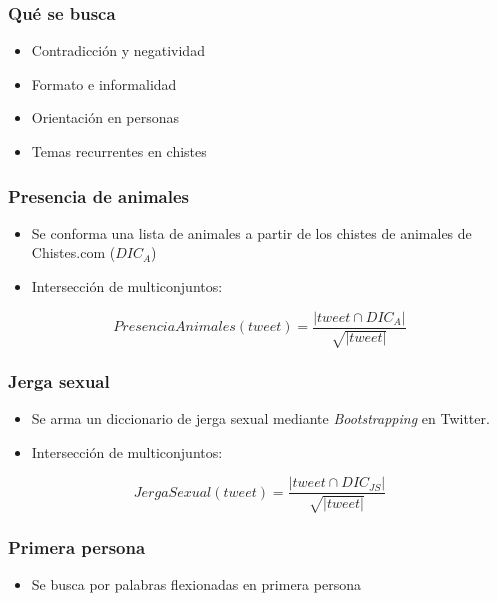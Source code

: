 \begin{frame}
    \frametitle{Qué se busca}

    \begin{itemize}[<+->]
        \item Contradicción y negatividad
        \item Formato e informalidad
        \item Orientación en personas
        \item Temas recurrentes en chistes
    \end{itemize}
\end{frame}

\begin{frame}
    \frametitle{Presencia de animales}

    \begin{itemize}
        \item Se conforma una lista de animales a partir de los chistes de animales de Chistes.com ($DIC_A$)
        \item Intersección de multiconjuntos:
    \end{itemize}

    \begin{center}
        \[
            PresenciaAnimales(tweet) = \frac{|tweet \cap DIC_A|}{\sqrt{|tweet|}}
        \]
    \end{center}
\end{frame}

\begin{frame}
    \frametitle{Jerga sexual}

    \begin{itemize}
        \item Se arma un diccionario de jerga sexual mediante \emph{Bootstrapping} en Twitter.
        \item Intersección de multiconjuntos:
    \end{itemize}

    \begin{center}
        \[
            JergaSexual(tweet) = \frac{|tweet \cap DIC_{JS}|}{\sqrt{|tweet|}}
        \]
    \end{center}
\end{frame}

\begin{frame}
    \frametitle{Primera persona}

    \begin{itemize}
        \item Se busca por palabras flexionadas en primera persona
    \end{itemize}
\end{frame}

